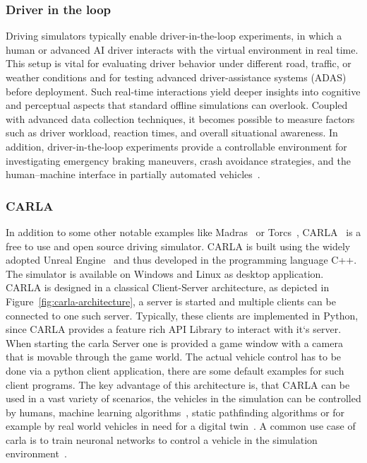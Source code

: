             \subsubsection{Driver in the loop}
                Driving simulators typically enable driver-in-the-loop experiments, in which a human or advanced AI driver interacts with the virtual environment in real time.
                This setup is vital for evaluating driver behavior under different road, traffic, or weather conditions and for testing advanced driver-assistance systems (ADAS) before deployment.
                Such real-time interactions yield deeper insights into cognitive and perceptual aspects that standard offline simulations can overlook.
                Coupled with advanced data collection techniques, it becomes possible to measure factors such as driver workload, reaction times, and overall situational awareness.
                In addition, driver-in-the-loop experiments provide a controllable environment for investigating emergency braking maneuvers, crash avoidance strategies, and the human–machine interface in partially automated vehicles~\cite{riener2017driver, riegler2023}.


            \subsubsection{CARLA}
                In addition to some other notable examples like Madras~\cite{santara2021madras} or Torcs~\cite{wymann2000torcs}, CARLA~\cite{carla2017} is a free to use and open source driving simulator.
                CARLA is built using the widely adopted Unreal Engine~\cite{lewis2002game} and thus developed in the programming language C++.
                The simulator is available on Windows and Linux as desktop application.
                CARLA is designed in a classical Client-Server architecture, as depicted in Figure~\ref{fig:carla-architecture}, a server is started and multiple clients can be connected to one such server.
                Typically, these clients are implemented in Python, since CARLA provides a feature rich API Library to interact with it`s server.
                When starting the carla Server one is provided a game window with a camera that is movable through the game world.
                The actual vehicle control has to be done via a python client application, there are some default examples for such client programs.
                The key advantage of this architecture is, that CARLA can be used in a vast variety of scenarios, the vehicles in the simulation can be controlled by humans, machine learning algorithms~\cite{liu2022synthetic}, static pathfinding algorithms or for example by real world vehicles in need for a digital twin~\cite{steinmetz2022digital}.
                A common use case of carla is to train neuronal networks to control a vehicle in the simulation environment~\cite{Codevilla2019, ramosautonomous}.

